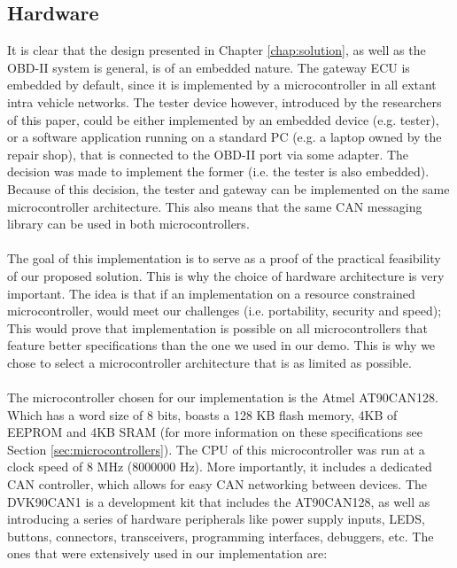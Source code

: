 \subsection{Hardware}
\label{sec:hardware}
It is clear that the design presented in Chapter \ref{chap:solution}, as well as the OBD-II system is general, is of an embedded nature. The gateway ECU is embedded by default, since it is implemented by a microcontroller in all extant intra vehicle networks. The tester device however, introduced by the researchers of this paper, could be either implemented by an embedded device (e.g. tester), or a software application running on a standard PC (e.g. a laptop owned by the repair shop), that is connected to the OBD-II port via some adapter. The decision was made to implement the former (i.e. the tester is also embedded). Because of this decision, the tester and gateway can be implemented on the same microcontroller architecture. This also means that the same CAN messaging library can be used in both microcontrollers.\\ \\ The goal of this implementation is to serve as a proof of the practical feasibility of our proposed solution. This is why the choice of hardware architecture is very important. The idea is that if an implementation on a resource constrained microcontroller, would meet our challenges (i.e. portability, security and speed); This would prove that implementation is possible on all microcontrollers that feature better specifications than the one we used in our demo. This is why we chose to select a microcontroller architecture that is as limited as possible.  \\ \\ The microcontroller chosen for our implementation is the Atmel AT90CAN128. Which has a word size of 8 bits, boasts a 128 KB flash memory, 4KB of EEPROM and 4KB SRAM (for more information on these specifications see  Section \ref{sec:microcontrollers}). The CPU of this microcontroller was run at a clock speed of 8 MHz (8000000 Hz). More importantly, it includes a dedicated CAN controller, which allows for easy CAN networking between devices. The DVK90CAN1 is a development kit that includes the AT90CAN128, as well as introducing a series of hardware peripherals like power supply inputs, LEDS, buttons, connectors, transceivers, programming interfaces, debuggers, etc. The ones that were extensively used in our implementation are:
